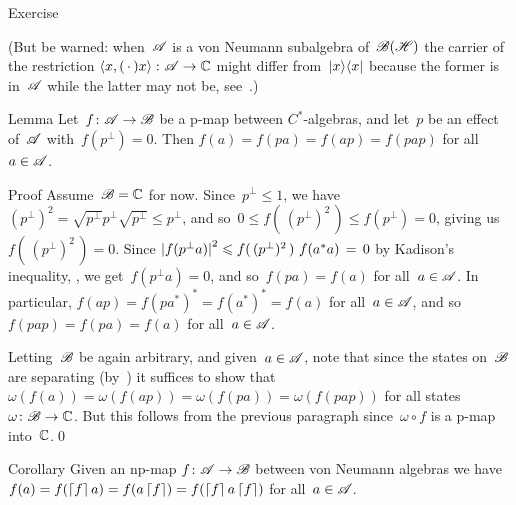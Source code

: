 \documentclass[a]{subfiles}
\begin{document}
\begin{parsec}
\begin{point}{Exercise}
\begin{enumerate}
(But be warned: when~$\scrA$ is a von Neumann subalgebra of~$\scrB(\scrH)$
the carrier of the restriction 
$\left<x,(\,\cdot\,)x\right>\colon \scrA\to\C$
might differ from~$\ketbra{x}{x}$ because the former is in~$\scrA$
while the latter may not be, see~.)
\end{enumerate}
\end{point}
\begin{point}[cp-comprehension]{Lemma}%
Let~$f\colon \scrA\to\scrB$ be a p-map between
$C^*$-algebras,
and let~$p$ be an effect of~$\scrA$ with~$f(p^\perp)=0$.
Then $f(a)=f(pa)=f(ap)=f(pap)$
for all~$a\in\scrA$.
\begin{point}{Proof}%
Assume~$\scrB=\C$ for now.
Since~$p^\perp \leq 1$,
we have $(p^\perp)^2=\sqrt{p^\perp}p^\perp \sqrt{p^\perp}
\leq p^\perp$,
and so~$0\leq f(\,(p^\perp)^2\,) \leq f(p^\perp) = 0$,
giving us $f(\,(p^\perp)^2\,)=0$.
Since
$\left|\smash{f(p^\perp a)}\right|^2
\leq f(\,(p^\perp)^2\,)\  f(a^*a)\,=\, 0$
by Kadison's inequality, , 
we get~$f(p^\perp a)=0$, and so~$f(pa)=f(a)$ for all~$a\in\scrA$.
In particular,
$f(ap)=f(pa^*)^*=f(a^*)^*=f(a)$
for all~$a\in\scrA$,
and so~$f(pap)=f(pa)=f(a)$
for all~$a\in \scrA$.

Letting~$\scrB$ be again arbitrary,
and given~$a\in\scrA$,
note that
since the states on~$\scrB$ 
are separating (by~)
it suffices 
to show that $\omega(f(a))=\omega(f(ap))=\omega(f(pa))=
\omega(f(pap))$ for all
states $\omega \colon \scrB\to\C$.
But this follows from the previous paragraph
since~$\omega\circ f$
is a p-map into~$\C$.\qed
\end{point}
\end{point}
\begin{point}{Corollary}%
Given an np-map $f\colon \scrA\to\scrB$
between von Neumann algebras
we have $f(a)=f(\ceil{f}a) = f(a\ceil{f})=f(\ceil{f}a\ceil{f})$
for all~$a\in\scrA$.
\end{point}
\end{parsec}
\end{document}
